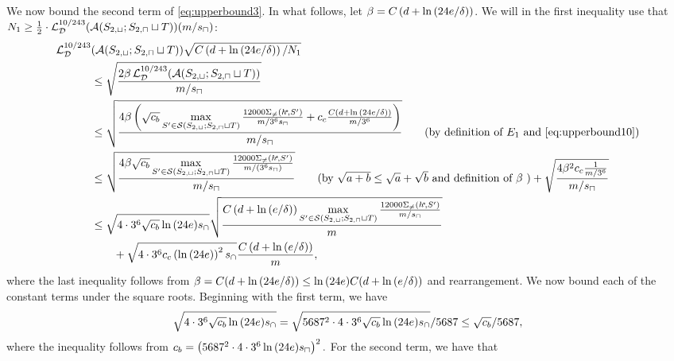 \begin{proofof}{}
We now bound the second term of \cref{eq:upperbound3}.
In what follows, let $ \beta= C\left(d+\ln{(24e/\delta )}\right)$. 
We will in the first inequality use that  $N_1 \geq \frac 12 \cdot  \operatorname{\mathcal{L}}_{\mathcal{D}}^{10/243}(\mathcal{A}(S_{2,\sqcup};S_{2,\sqcap}\sqcup T))(m/s_{\sqcap})$: 
\begin{align}\label{eq:upperbound18}
 \ls_{\cD}^{10/243} & (\erm(S_{2,\sqcup};S_{2,\sqcap}\sqcup T)) \sqrt{C\left(d+ \ln{(\ch e/\delta )}\right)/N_1}  \\
    &\leq\sqrt{\frac{2\beta\ls_{\cD}^{10/243}(\erm(S_{2,\sqcup};S_{2,\sqcap}\sqcup T))}{m/s_{\sqcap}}} \nonumber
    \\
    &\leq
\sqrt{\frac{4\beta   \left(\sqrt{\cb}\max\limits_{S'\in\cS(S_{2,\sqcup};S_{2,\sqcap}\sqcup T)} 
\frac{12000\Sigma_{\not=}(\hs\negmedspace,S')}{m/3^6 s_{\sqcap}}+\cc \frac{C\left(d+\ln{(\ch e/\delta  )}\right)}{m/3^6}  \right)}{m/s_{\sqcap}}}\tag{by definition of $ E_{1} $ and \cref{eq:upperbound10}}
    \\
    &\leq
\sqrt{\frac{4\beta\sqrt{\cb}\max\limits_{S'\in\cS(S_{2,\sqcup};S_{2,\sqcap}\sqcup T)} 
\frac{12000\Sigma_{\not=}(\hs\negmedspace,S')}{m/(3^6 s_{\sqcap})}}{m/s_{\sqcap}}}\tag{by $ \sqrt{a+b}\leq \sqrt{a}+\sqrt{b} $ and definition of $ \beta $ }
    + 
\sqrt{\frac{4\beta^{2}\cc \frac{1}{m/3^6}}{m/s_{\sqcap}}}\nonumber
    \\
    &\leq
   \sqrt{4\cdot 3^{6}\sqrt{\cb}\ln{\left(\ch e \right)} s_{\cap}}
   \sqrt{\frac{C\left(d+\ln{(e/\delta )}\right) \max\limits_{S'\in\cS(S_{2,\sqcup};S_{2,\sqcap}\sqcup T)}\frac{12000\Sigma_{\not=}(\hs\negmedspace,S')}{m/ s_{\sqcap}} }{m}} \nonumber \\
   & \qquad +
   \sqrt{4\cdot3^{6}\cc \left(\ln{\left(\ch e \right)}\right)^{2}s_{\cap}}
    \frac{C\left(d+\ln{(e/\delta )}\right) }{m}, \nonumber 
\end{align}
where the last inequality follows from $ \beta=C(d+\ln{(24e/\delta )})\leq \ln{(24e)}C(d+\ln{(e/\delta )}) $ and rearrangement.
We now bound each of the constant terms under the square roots. 
Beginning with the first term, we have 
\begin{align}\label{eq:upperbound11}
    \sqrt{4\cdot 3^{6}\sqrt{c_b}\ln{\left(24e \right)} s_{\cap}}= \sqrt{5687^2 \cdot4\cdot 3^{6}\sqrt{c_b}\ln{\left(24e \right)} s_{\cap}}/5687
    \leq
    \sqrt{c_b}/5687,
\end{align}
where the inequality follows from $c_b=\left(5687^2\cdot4\cdot3^{6} \ln{(24e)}s_{\sqcap}\right)^{2}.$ 
For the second term, we have that
\begin{align}\label{eq:upperbound12}

\end{align}
\end{proofof}

